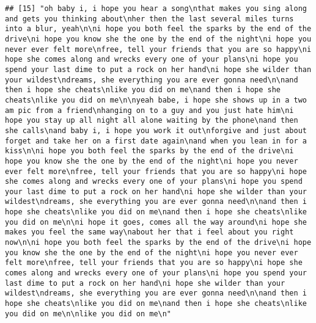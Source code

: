 \documentclass[]{article}
\begin{document}
\begin{verbatim}
## [15] "oh baby i, i hope you hear a song\nthat makes you sing along and gets you thinking about\nher then the last several miles turns into a blur, yeah\n\ni hope you both feel the sparks by the end of the drive\ni hope you know she the one by the end of the night\ni hope you never ever felt more\nfree, tell your friends that you are so happy\ni hope she comes along and wrecks every one of your plans\ni hope you spend your last dime to put a rock on her hand\ni hope she wilder than your wildest\ndreams, she everything you are ever gonna need\n\nand then i hope she cheats\nlike you did on me\nand then i hope she cheats\nlike you did on me\n\nyeah babe, i hope she shows up in a two am pic from a friend\nhanging on to a guy and you just hate him\ni hope you stay up all night all alone waiting by the phone\nand then she calls\nand baby i, i hope you work it out\nforgive and just about forget and take her on a first date again\nand when you lean in for a kiss\n\ni hope you both feel the sparks by the end of the drive\ni hope you know she the one by the end of the night\ni hope you never ever felt more\nfree, tell your friends that you are so happy\ni hope she comes along and wrecks every one of your plans\ni hope you spend your last dime to put a rock on her hand\ni hope she wilder than your wildest\ndreams, she everything you are ever gonna need\n\nand then i hope she cheats\nlike you did on me\nand then i hope she cheats\nlike you did on me\n\ni hope it goes, comes all the way around\ni hope she makes you feel the same way\nabout her that i feel about you right now\n\ni hope you both feel the sparks by the end of the drive\ni hope you know she the one by the end of the night\ni hope you never ever felt more\nfree, tell your friends that you are so happy\ni hope she comes along and wrecks every one of your plans\ni hope you spend your last dime to put a rock on her hand\ni hope she wilder than your wildest\ndreams, she everything you are ever gonna need\n\nand then i hope she cheats\nlike you did on me\nand then i hope she cheats\nlike you did on me\n\nlike you did on me\n"                                                                                                                                                                                                                                                                                                                                                                                                                                                                                                                                                                                                                                                                                                                                                                                               

\end{verbatim}
\end{document}
